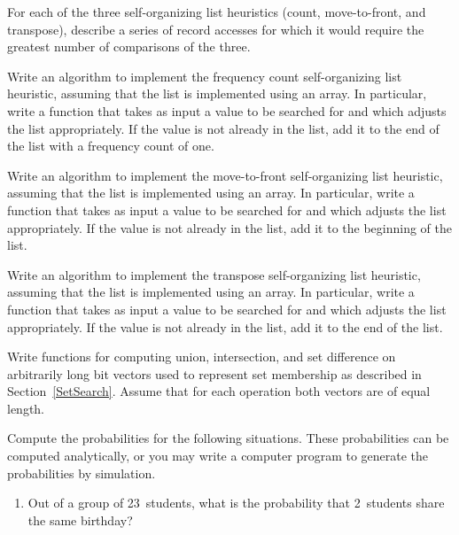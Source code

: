 \begin{exercises}
\item
For each of the three self-organizing list
heuristics (count, move-to-front, and transpose), describe a
series of record accesses for which it would require the greatest number
of comparisons of the three.

\item
Write an algorithm to implement the frequency count
self-organizing list heuristic,
assuming that the list is implemented using an array.
In particular, write a function  that takes as input a
value to be searched for and which adjusts the list appropriately.
If the value is not already in the list, add it to the end of the list
with a frequency count of one.

\item
Write an algorithm to implement the move-to-front
self-organizing list
heu\-ri\-s\-tic, assuming that the list is implemented using an array.
In particular, write a function  that takes as input
a value to be searched for and which adjusts the list appropriately.
If the value is not already in the list, add it to the beginning of
the list.

\item
Write an algorithm to implement the transpose
self-organizing list heuristic, assuming that the list is implemented
using an array.
In particular, write a function  that takes as input a
value to be searched for and which adjusts the list appropriately.
If the value is not already in the list, add it to the end of the list.

\item
Write functions for computing union, intersection, and set difference
on arbitrarily long bit vectors used to represent set membership as
described in
Section~\ref{SetSearch}.
Assume that for each operation both vectors are of equal length.

\item
Compute the probabilities for the following
situations.
These probabilities can be computed analytically, or you may write a
computer program to generate the probabilities by simulation.

\begin{enumerate}
\item Out of a group of 23~students, what is the probability that
2~students share the same birthday?


\end{enumerate}
\end{exercises}
